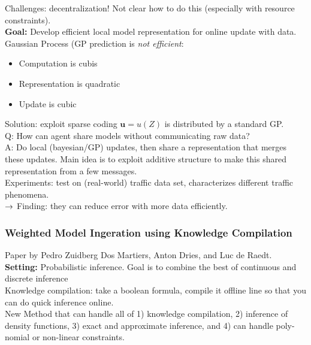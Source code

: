 Challenges: decentralization! Not clear how to do this (especially with resource constraints). \\

{\bf Goal:} Develop efficient local model representation for online update with data. \\

Gaussian Process (GP prediction is {\it not efficient}:
\begin{itemize}
    \item Computation is cubis
    \item Representation is quadratic
    \item Update is cubic
\end{itemize}

Solution: exploit sparse coding $\bm{u} = u(Z)$ is distributed by a standard GP. \\

Q: How can agent share models without communicating raw data? \\

A: Do local (bayesian/GP) updates, then share a representation that merges these updates. Main idea is to exploit additive structure to make this shared representation from a few messages.\\


Experiments: test on (real-world) traffic data set, characterizes different traffic phenomena. \\

$\rightarrow$ Finding: they can reduce error with more data efficiently. 


\spacerule


\subsubsection{Weighted Model Ingeration using Knowledge Compilation}

Paper by Pedro Zuidberg Dos Martiers, Anton Dries, and Luc de Raedt. \\

{\bf Setting:} Probabilistic inference.  Goal is to combine the best of continuous and discrete inference \\

Knowledge compilation: take a boolean formula, compile it offline line so that you can do quick inference online. \\

New Method that can handle all of 1) knowledge compilation, 2) inference of density functions, 3) exact and approximate inference, and 4) can handle poly-nomial or non-linear constraints. \\


